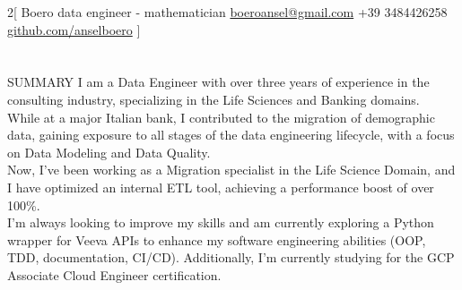 \documentclass{my_cv}
\begin{document}
\begin{multicols}{2}[
        {Boero}%
        {data engineer - mathematician}%
        {\href{mailto:boeroansel@gmail.com}{boeroansel@gmail.com}}%
        {+39 3484426258}%
        {\href{https://github.com/anselboero}{github.com/anselboero}}%
        {}%
]
\end{multicols}

\section{\faFileText}{SUMMARY}
I am a Data Engineer with over three years of experience in the consulting industry, specializing in the Life Sciences and Banking domains.\\While at a major Italian bank, I contributed to the migration of demographic data, gaining exposure to all stages of the data engineering lifecycle, with a focus on Data Modeling and Data Quality.\\Now, I've been working as a Migration specialist in the Life Science Domain, and I have optimized an internal ETL tool, achieving a performance boost of over 100\%.\\I'm always looking to improve my skills and am currently exploring a Python wrapper for Veeva APIs to enhance my software engineering abilities (OOP, TDD, documentation, CI/CD). Additionally, I'm currently studying for the GCP Associate Cloud Engineer certification.
\end{document}
